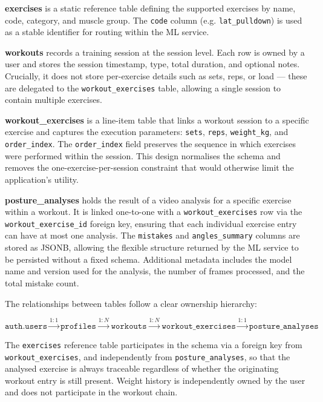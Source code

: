 \textbf{exercises} is a static reference table defining the supported exercises by name, code, category, and muscle group. The \texttt{code} column (e.g. \texttt{lat\_pulldown}) is used as a stable identifier for routing within the ML service.

\textbf{workouts} records a training session at the session level. Each row is owned by a user and stores the session timestamp, type, total duration, and optional notes. Crucially, it does not store per-exercise details such as sets, reps, or load — these are delegated to the \texttt{workout\_exercises} table, allowing a single session to contain multiple exercises.

\textbf{workout\_exercises} is a line-item table that links a workout session to a specific exercise and captures the execution parameters: \texttt{sets}, \texttt{reps}, \texttt{weight\_kg}, and \texttt{order\_index}. The \texttt{order\_index} field preserves the sequence in which exercises were performed within the session. This design normalises the schema and removes the one-exercise-per-session constraint that would otherwise limit the application's utility.

\textbf{posture\_analyses} holds the result of a video analysis for a specific exercise within a workout. It is linked one-to-one with a \texttt{workout\_exercises} row via the \texttt{workout\_exercise\_id} foreign key, ensuring that each individual exercise entry can have at most one analysis. The \texttt{mistakes} and \texttt{angles\_summary} columns are stored as JSONB, allowing the flexible structure returned by the ML service to be persisted without a fixed schema. Additional metadata includes the model name and version used for the analysis, the number of frames processed, and the total mistake count.

The relationships between tables follow a clear ownership hierarchy:

\begin{equation}
    \texttt{auth.users} \xrightarrow{1:1} \texttt{profiles} \xrightarrow{1:N} \texttt{workouts} \xrightarrow{1:N} \texttt{workout\_exercises} \xrightarrow{1:1} \texttt{posture\_analyses}
    \label{eq:dbrel}
\end{equation}

The \texttt{exercises} reference table participates in the schema via a foreign key from \texttt{workout\_exercises}, and independently from \texttt{posture\_analyses}, so that the analysed exercise is always traceable regardless of whether the originating workout entry is still present. Weight history is independently owned by the user and does not participate in the workout chain.
